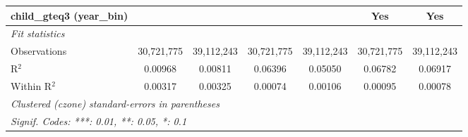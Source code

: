 \begin{tabular}{lcccccc}
child\_gteq3 (year\_bin) &  &  &  &  & Yes & Yes\\
\midrule \emph{Fit statistics}&  & & & & & \\
Observations & 30,721,775&39,112,243&30,721,775&39,112,243&30,721,775&39,112,243\\
R$^2$ & 0.00968&0.00811&0.06396&0.05050&0.06782&0.06917\\
Within R$^2$ & 0.00317&0.00325&0.00074&0.00106&0.00095&0.00078\\
\midrule\midrule\multicolumn{7}{l}{\emph{Clustered (czone) standard-errors in parentheses}}\\
\multicolumn{7}{l}{\emph{Signif. Codes: ***: 0.01, **: 0.05, *: 0.1}}\\
\end{tabular}


